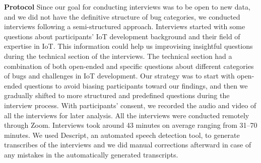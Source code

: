 
\textbf{Protocol} \label{interviewProtocol}
Since our goal for conducting interviews was to be open to new data, and we did not have the definitive structure of bug categories, we conducted interviews following a semi-structured approach. Interviews started with some questions about participants' IoT development background and their field of expertise in IoT. This information could help us improvising insightful questions during the technical section of the interviews. The technical section had a combination of both open-ended and specific questions about different categories of bugs and challenges in IoT development. Our strategy was to start with open-ended questions to avoid biasing participants toward our findings, and then we gradually shifted to more structured and predefined questions during the interview process.  With participants' consent, we recorded the audio and video of all the interviews for later analysis. All the interviews were conducted remotely through Zoom. Interviews took around 43 minutes on average ranging from 31--70 minutes. We used Descript, an automated speech detection tool, to generate transcribes of the interviews and we did manual corrections afterward in case of any mistakes in the automatically generated transcripts.

